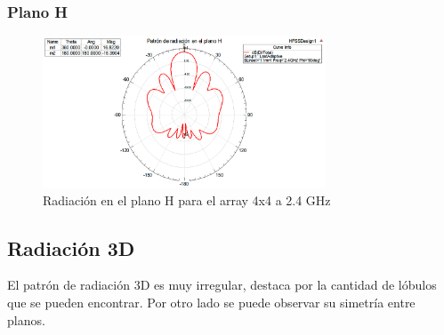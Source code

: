 \subsubsection{Plano H}
\begin{figure}[H]
    \centering
        \includegraphics[width=0.75\textwidth]{archivos/analisis/4x41/5}
        \caption{Radiación en el plano H para el array 4x4 a 2.4 GHz}
        \label{fig:H4x41}
\end{figure}

\subsection{Radiación 3D}
\par El patrón de radiación 3D es muy irregular, destaca por la cantidad de lóbulos que se pueden encontrar. Por otro lado se puede observar su simetría entre planos.

